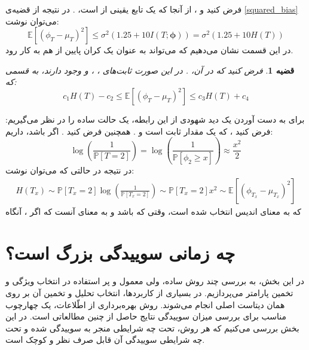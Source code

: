 \documentclass[a4paper,12pt]{article}
\newtheorem{thm}{{\large\bf قضیه}}[section]
\newcommand{\E}{\mathbb{E}}
\newcommand{\Prob}{\mathbb{P}}
\newcommand{\bfphi}{\bm {\phi}}
\newcommand{\Nd}{\mathcal{N}}
\begin{document}
	فرض کنید
	\lr{$\bfphi \sim \mathcal{N}(\bm{\mu}, I)$}
	و
	،
	از آنجا که 
	یک تابع یقینی از 
	\lr{$\bfphi$}
	است، 
	\lr{$I(T;\bfphi) = H(T)$}.
	در نتیجه از قضیه‌ی 
	\eqref{squared_bias}
	می‌توان نوشت:
	\begin{equation}
	\E\left[(\phi_T-\mu_T)^2\right] \leq \sigma^2(1.25 + 10I(T;\bfphi)) = \sigma^2(1.25 + 10H(T)) 
	\end{equation}
	در این قسمت نشان می‌دهیم که 
	می‌تواند به عنوان یک کران پایین از
	\lr{$\E\left[(\phi_T-\mu_T)^2\right] $}
	هم به کار رود.
	\begin{thm}\label{lower_bound}
		فرض کنید
		که در آن،
		\lr{$\bfphi \sim \mathcal{N}(\bm{\mu}, I)$}.
		در این صورت ثابت‌های
		،
		،
		و
		وجود دارند، به قسمی که:
		\begin{equation}
		c_1H(T)-c_2\leq \E\left[(\phi_T-\mu_T)^2\right] \leq c_3H(T)+c_4
		\end{equation}
	\end{thm}
	
	برای به دست آوردن یک دید شهودی از این رابطه، یک حالت ساده را در نظر می‌گیریم: فرض کنید
	،
	که 
	یک مقدار ثابت است و 
	\lr{$\phi_2 \sim\Nd(0,1)$}.
	همچنین فرض کنید
	.
	اگر 
	باشد، داریم:
	\[\log(\frac{1}{\Prob[T=2]}) = \log(\frac{1}{\Prob[\phi_2 \geq x]}) \approx \frac{x^{2}}{2}\]
	در نتیجه در حالتی که
	می‌توان نوشت:
	\begin{align*}
	H(T_x) \sim \Prob[T_x=2]\log(\frac{1}{\Prob[T_x=2]}) \sim  \Prob[T_x=2]x^{2} \sim\E\left[(\phi_{T_x} - \mu_{T_x})^2\right] 
	\end{align*}
	که
	به معنای اندیس انتخاب شده است، وقتی که
	باشد و 
	به معنای آنست که اگر
	،
	آنگاه
	
	
	
	\section{چه زمانی سوییدگی بزرگ است؟}\label{when_bias_large}
	در این بخش، به بررسی چند روش ساده، ولی معمول و پر استفاده در انتخاب ویژگی و تخمین پارامتر می‌پردازیم. در بسیاری از کاربرد‌ها، انتخاب تحلیل و تخمین آن بر روی همان دیتاست اصلی انجام می‌شوند. روش بهره‌برداری از اطّلاعات، یک چهارچوب مناسب برای بررسی میزان سوییدگی نتایج حاصل از چنین مطالعاتی است. در این بخش بررسی می‌کنیم که هر روش، تحت چه شرایطی منجر به سوییدگی شده و تحت چه شرایطی سوییدگی آن قابل صرف نظر و کوچک است.
	
\end{document}
